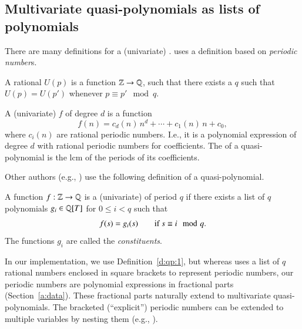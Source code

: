 \subsection{Multivariate quasi-polynomials as lists of polynomials}

There are many definitions for a (univariate) .
 uses a definition based on {\em periodic number}s.

\begin{definition}
\label{d:periodic:1}
A rational  $U(p)$
is a function $\mathbb{Z} \to \mathbb{Q}$,
such that there exists a  $q$
such that $U(p) = U(p')$ whenever $p \equiv p' \mod q$.
\end{definition}

\begin{definition}
\label{d:qp:1}
A (univariate)
\/ $f$ of degree $d$ is
a function
$$
f(n) = c_d(n) \, n^d + \cdots + c_1(n) \, n + c_0
,
$$
where $c_i(n)$ are rational periodic numbers.
I.e., it is a polynomial expression of degree $d$ 
with rational periodic numbers for coefficients.
The  of a quasi-polynomial is the \ac{lcm}
of the periods of its coefficients.
\end{definition}

Other authors (e.g., )
use the following definition of a quasi-polynomial.
\begin{definition}
\label{d:qp:1:list}
A function $f : \mathbb{Z} \to \mathbb{Q}$ is
a (univariate)  of period $q$ if there
exists a list of $q$ polynomials $g_i \in \mathbb{Q}[T]$ for $0 \le i < q$ such
that
\[
f (s) = g_i(s) \qquad \hbox{if $s \equiv i \mod {q}$}
.
\]
The functions $g_i$ are called the {\em constituents}.
\end{definition}

In our implementation, we use Definition~\ref{d:qp:1},
but whereas
 uses a list of $q$ rational
numbers enclosed in square brackets to represent periodic
numbers, our periodic numbers are polynomial expressions
in fractional parts (Section~\ref{a:data}).
These fractional parts naturally extend to multivariate
quasi-polynomials.
The bracketed (``explicit'') periodic numbers can
be extended to multiple variables by nesting them
(e.g., ).


